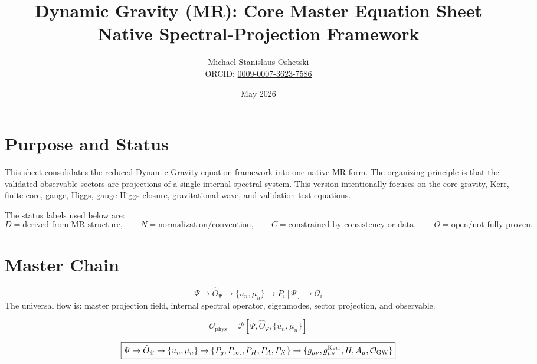 \documentclass[11pt]{article}
\title{Dynamic Gravity (MR): Core Master Equation Sheet\\Native Spectral-Projection Framework}
\author{Michael Stanislaus Oshetski \\ \small ORCID: \href{https://orcid.org}{0009-0007-3623-7586}}
\date{May 2026}
\newcommand{\phys}{\mathrm{phys}}
\newcommand{\Kerr}{\mathrm{Kerr}}
\begin{document}
\maketitle

\section*{Purpose and Status}
This sheet consolidates the reduced Dynamic Gravity equation framework into one native  MR form.  The organizing principle is that the validated observable sectors are projections of a single internal spectral system.  This version intentionally focuses on the core gravity, Kerr, finite-core, gauge, Higgs, gauge-Higgs closure, gravitational-wave, and validation-test equations.

The status labels used below are:
\[
D=\text{derived from MR structure},\qquad
N=\text{normalization/convention},\qquad
C=\text{constrained by consistency or data},\qquad
O=\text{open/not fully proven}.
\]

\section{Master Chain}
\begin{equation}
\boxed{
\Psi \rightarrow \hat O_\Psi \rightarrow \{u_n,\mu_n\}
\rightarrow P_i[\Psi] \rightarrow \mathcal O_i
}
\end{equation}
The universal flow is: master projection field, internal spectral operator, eigenmodes, sector projection, and observable.

\begin{equation}
\boxed{
\mathcal O_{\phys}
=
\mathcal P\left[\Psi,\hat O_\Psi,\{u_n,\mu_n\}\right]
}
\end{equation}

\begin{equation}
\boxed{
\Psi
\rightarrow
\hat O_\Psi
\rightarrow
\{u_n,\mu_n\}
\rightarrow
\{P_g,P_{\rm rot},P_H,P_A,P_X\}
\rightarrow
\{g_{\mu\nu},g_{\mu\nu}^{\Kerr},H,A_\mu,\mathcal O_{\rm GW}\}
}
\end{equation}
\end{document}
